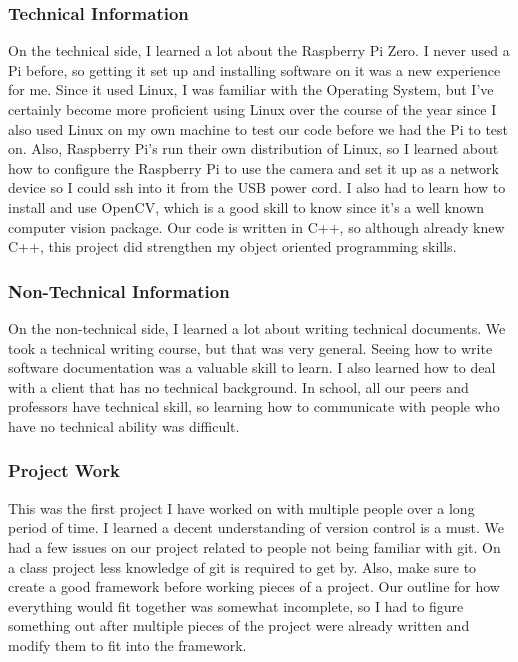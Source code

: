 \documentclass[10pt,letterpaper,onecolumn,draftclsnofoot,journal]{IEEEtran}
\begin{document}
\subsubsection{\textbf{Technical Information}}
On the technical side, I learned a lot about the Raspberry Pi Zero. I never used a Pi before, so getting it set up and installing software on it was a new experience for me. Since it used Linux, I was familiar with the Operating System, but I've certainly become more proficient using Linux over the course of the year since I also used Linux on my own machine to test our code before we had the Pi to test on. Also, Raspberry Pi's run their own distribution of Linux, so I learned about how to configure the Raspberry Pi to use the camera and set it up as a network device so I could ssh into it from the USB power cord. I also had to learn how to install and use OpenCV, which is a good skill to know since it's a well known computer vision package. Our code is written in C++, so although already knew C++, this project did strengthen my object oriented programming skills.\vspace{.3cm}

\subsubsection{\textbf{Non-Technical Information}}
On the non-technical side, I learned a lot about writing technical documents. We took a technical writing course, but that was very general. Seeing how to write software documentation was a valuable skill to learn. I also learned how to deal with a client that has no technical background. In school, all our peers and professors have technical skill, so learning how to communicate with people who have no technical ability was difficult.\vspace{.3cm}

\subsubsection{\textbf{Project Work}}
This was the first project I have worked on with multiple people over a long period of time. I learned a decent understanding of version control is a must. We had a few issues on our project related to people not being familiar with git. On a class project less knowledge of git is required to get by. Also, make sure to create a good framework before working pieces of a project. Our outline for how everything would fit together was somewhat incomplete, so I had to figure something out after multiple pieces of the project were already written and modify them to fit into the framework.\vspace{.3cm}
\end{document}
